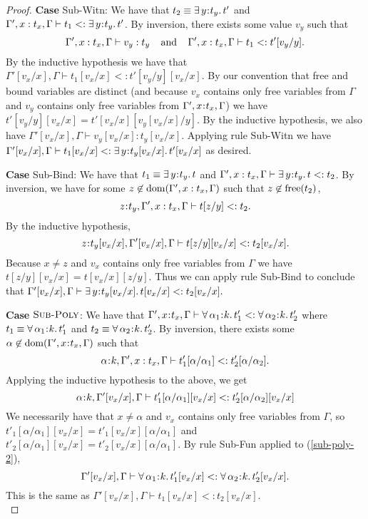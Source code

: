 \documentclass[11pt]{article}
\newcommand{\al}{\alpha}
\newcommand{\bind}{\hspace{0.05em}{:}\hspace{0.05em}} %
\newcommand{\existype}[3]{\exists\, #1\bind #2.\, #3}
\newcommand{\polytype}[3]{\forall\, #1\bind #2.\, #3}
\newcommand{\dom}[1]{{\rm dom}(#1)}
\begin{document}
\begin{proof}
{\bf Case} {\sc Sub-Witn}: We have that $t_2 \equiv \existype{y}{t_y}{t'}$ and $\Gamma', x:t_x,\Gamma \vdash t_1 <: \existype{y}{t_y}{t'}$. By inversion, there exists some value $v_y$ such that
\begin{equation}
\Gamma', x:t_x,\Gamma \vdash v_y : t_y \;\;\;\;{\rm and}\;\;\;\;
\Gamma', x:t_x,\Gamma \vdash t_1 <: t'[v_y/y].
\end{equation}
By the inductive hypothesis we have that $\Gamma'[v_x/x], \Gamma \vdash t_1[v_x/x] <: t'[v_y/y][v_x/x]$. By our convention that free and bound variables are distinct (and because $v_x$ contains only free variables from $\Gamma$ and $v_y$ contains only free variables from $\Gamma', x\bind t_x,\Gamma$) we have $t'[v_y/y][v_x/x] = t'[v_x/x][v_y[v_x/x]/y]$. By the inductive hypothesis, we also have $\Gamma'[v_x/x], \Gamma \vdash v_y[v_x/x] : t_y[v_x/x]$. Applying rule {\sc Sub-Witn} we have $\Gamma'[v_x/x], \Gamma \vdash t_1[v_x/x] <: \existype{y}{t_y[v_x/x]}{t'[v_x/x]}$ as desired.

{\bf Case} {\sc Sub-Bind}: We have that $t_1 \equiv \existype{y}{t_y}{t}$ and $\Gamma', x:t_x,\Gamma \vdash\existype{y}{t_y}{t} <: t_2$. By inversion, we have for some $z\not\in\dom{\Gamma', x:t_x,\Gamma}$ such that $z\not\in{\rm free}(t_2)$,
\[
z\bind t_y, \Gamma', x:t_x,\Gamma \vdash t[z/y] <: t_2.
\]
By the inductive hypothesis,
\begin{equation}
z\bind t_y[v_x/x], \Gamma'[v_x/x], \Gamma \vdash t[z/y][v_x/x] <: t_2[v_x/x].
\end{equation}
Because $x \neq z$ and $v_x$ contains only free variables from $\Gamma$ we have $t[z/y][v_x/x] = t[v_x/x][z/y]$. Thus we can apply rule {\sc Sub-Bind} to conclude that
$\Gamma'[v_x/x], \Gamma \vdash \existype{y}{t_y[v_x/x]}{t[v_x/x]} <: t_2[v_x/x].$

{\bf Case} $\textsc{Sub-Poly}$: We have that
$\Gamma', x\bind t_x,\Gamma \vdash \polytype{\al_1}{k}{t'_1} <: \polytype{\al_2}{k}{t'_2}$ where $t_1 \equiv \polytype{\al_1}{k}{t'_1}$ and $t_2 \equiv \polytype{\al_2}{k}{t'_2}$. By inversion, there exists some $\al\not\in\dom{\Gamma',x\bind t_x,\Gamma}$ such that
\[
\al\bind k, \Gamma',x:t_x,\Gamma \vdash t'_1[\al/\al_1] <: t'_2[\al/\al_2].
\]
Applying the inductive hypothesis to the above, we get
\begin{equation}\label{sub-poly-2}
\al\bind k,\Gamma'[v_x/x],\Gamma \vdash t'_1[\al/\al_1][v_x/x] <: t'_2[\al/\al_2][v_x/x]
\end{equation}
We necessarily have that $x \neq \al$ and $v_x$ contains only free variables from $\Gamma$, so
$t'_1[\al/\al_1][v_x/x] = t'_1[v_x/x][\al/\al_1]$ and $t'_2[\al/\al_1][v_x/x] = t'_2[v_x/x][\al/\al_1]$.
By rule {\sc Sub-Fun} applied to (\ref{sub-poly-2}),
\[
\Gamma'[v_x/x],\Gamma \vdash \polytype{\al_1}{k}{t'_1[v_x/x]} <: \polytype{\al_2}{k}{t'_2[v_x/x]}.
\]
This is the same as 
$\Gamma'[v_x/x],\Gamma \vdash t_1[v_x/x] <: t_2[v_x/x]$. \\


\end{proof}
\end{document}
